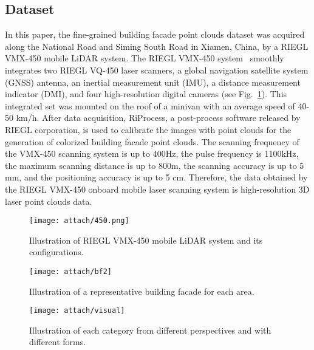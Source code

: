 \documentclass[review]{elsarticle}
\begin{document}
\subsection{\textbf{Dataset}}
In this paper, the fine-grained building facade point clouds dataset was acquired along the National Road and Siming South Road in Xiamen, China, by a RIEGL VMX-450 mobile LiDAR system. The RIEGL VMX-450 system~\cite{450} smoothly integrates two RIEGL VQ-450 laser scanners, a global navigation satellite system (GNSS) antenna, an inertial measurement unit (IMU), a distance measurement indicator (DMI), and four high-resolution digital cameras (see Fig.~\ref{fig:450}). This integrated set was mounted on the roof of a minivan with an average speed of 40-50 km/h. After data acquisition, RiProcess, a post-process software released by RIEGL corporation, is used to calibrate the images with point clouds for the generation of colorized building facade point clouds. The scanning frequency of the VMX-450 scanning system is up to 400Hz, the pulse frequency is 1100kHz, the maximum scanning distance is up to 800m, the scanning accuracy is up to 5 mm, and the positioning accuracy is up to 5 cm. Therefore, the data obtained by the RIEGL VMX-450 onboard mobile laser scanning system is high-resolution 3D laser point clouds data.
\begin{figure}[!t]
	\centering \large
	\texttt{[image: attach/450.png]}
	\caption{Illustration of RIEGL VMX-450 mobile LiDAR system and its configurations.}
	\label{fig:450}
\end{figure}

\begin{figure}[!t]
	\centering \large
	\texttt{[image: attach/bf2]}
	\caption{Illustration of a representative building facade for each area.}
	\label{fig:bf}
\end{figure}

\begin{figure}[!htbp]
	\centering \large
	\texttt{[image: attach/visual]}
	\caption{Illustration of each category from different perspectives and with different forms.}
	\label{fig:visual}
\end{figure}
\end{document}
